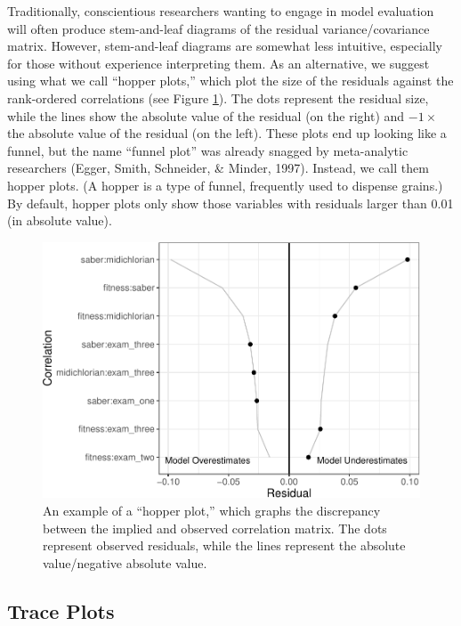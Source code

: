 \documentclass[
  english,
  doc]{apa6}
\begin{document}
Traditionally, conscientious researchers wanting to engage in model evaluation will often produce stem-and-leaf diagrams of the residual variance/covariance matrix. However, stem-and-leaf diagrams are somewhat less intuitive, especially for those without experience interpreting them. As an alternative, we suggest using what we call ``hopper plots,'' which plot the size of the residuals against the rank-ordered correlations (see Figure \ref{fig:hopper}). The dots represent the residual size, while the lines show the absolute value of the residual (on the right) and \(-1\times\) the absolute value of the residual (on the left). These plots end up looking like a funnel, but the name ``funnel plot'' was already snagged by meta-analytic researchers (Egger, Smith, Schneider, \& Minder, 1997). Instead, we call them hopper plots. (A hopper is a type of funnel, frequently used to dispense grains.) By default, hopper plots only show those variables with residuals larger than 0.01 (in absolute value).

\begin{figure}
\centering
\includegraphics{flexplavaan_draft_files/figure-latex/hopper-1.pdf}
\caption{\label{fig:hopper}An example of a ``hopper plot,'' which graphs the discrepancy between the implied and observed correlation matrix. The dots represent observed residuals, while the lines represent the absolute value/negative absolute value.}
\end{figure}

\hypertarget{trace-plots}{%
\subsection{Trace Plots}\label{trace-plots}}
\end{document}
